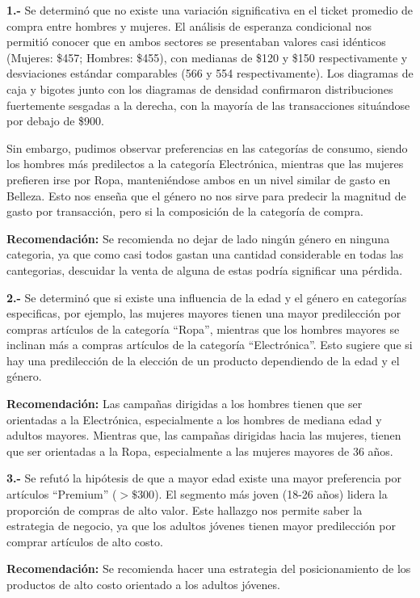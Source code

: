 \documentclass[oneside,11pt]{Latex/Classes/PhDthesisPSnPDF}
\begin{document}
\textbf{1.-} Se determinó que no existe una variación significativa en
el ticket promedio de compra entre hombres y mujeres. El análisis de
esperanza condicional nos permitió conocer que en ambos sectores se
presentaban valores casi idénticos (Mujeres: \$457; Hombres: \$455), con
medianas de \$120 y \$150 respectivamente y desviaciones estándar
comparables (566 y 554 respectivamente). Los diagramas de caja y bigotes
junto con los diagramas de densidad confirmaron distribuciones
fuertemente sesgadas a la derecha, con la mayoría de las transacciones
situándose por debajo de \$900.

Sin embargo, pudimos observar preferencias en las categorías de consumo,
siendo los hombres más predilectos a la categoría Electrónica, mientras
que las mujeres prefieren irse por Ropa, manteniéndose ambos en un nivel
similar de gasto en Belleza. Esto nos enseña que el género no nos sirve
para predecir la magnitud de gasto por transacción, pero si la
composición de la categoría de compra.

\textbf{Recomendación:} Se recomienda no dejar de lado ningún género en
ninguna categoria, ya que como casi todos gastan una cantidad
considerable en todas las cantegorias, descuidar la venta de alguna de
estas podría significar una pérdida.

\textbf{2.-} Se determinó que si existe una influencia de la edad y el
género en categorías especificas, por ejemplo, las mujeres mayores
tienen una mayor predilección por compras artículos de la categoría
``Ropa'', mientras que los hombres mayores se inclinan más a compras
artículos de la categoría ``Electrónica''. Esto sugiere que si hay una
predilección de la elección de un producto dependiendo de la edad y el
género.

\textbf{Recomendación:} Las campañas dirigidas a los hombres tienen que
ser orientadas a la Electrónica, especialmente a los hombres de mediana
edad y adultos mayores. Mientras que, las campañas dirigidas hacia las
mujeres, tienen que ser orientadas a la Ropa, especialmente a las
mujeres mayores de 36 años.

\textbf{3.-} Se refutó la hipótesis de que a mayor edad existe una mayor
preferencia por artículos ``Premium'' (\(> \$300\)). El segmento más
joven (18-26 años) lidera la proporción de compras de alto valor. Este
hallazgo nos permite saber la estrategia de negocio, ya que los adultos
jóvenes tienen mayor predilección por comprar artículos de alto costo.

\textbf{Recomendación:} Se recomienda hacer una estrategia del
posicionamiento de los productos de alto costo orientado a los adultos
jóvenes.
\end{document}
